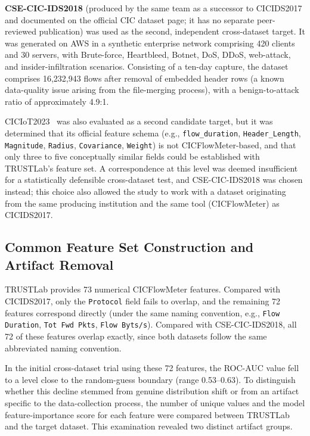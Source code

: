 \documentclass[a4paper,fleqn]{cas-sc}
\begin{document}
\textbf{CSE-CIC-IDS2018} (produced by the same team as a successor to CICIDS2017 and documented on the official CIC dataset page; it has no separate peer-reviewed publication) was used as the second, independent cross-dataset target. It was generated on AWS in a synthetic enterprise network comprising 420 clients and 30 servers, with Brute-force, Heartbleed, Botnet, DoS, DDoS, web-attack, and insider-infiltration scenarios. Consisting of a ten-day capture, the dataset comprises 16,232,943 flows after removal of embedded header rows (a known data-quality issue arising from the file-merging process), with a benign-to-attack ratio of approximately 4.9:1.

CICIoT2023~\cite{Neto2023} was also evaluated as a second candidate target, but it was determined that its official feature schema (e.g., \texttt{flow\_duration}, \texttt{Header\_Length}, \texttt{Magnitude}, \texttt{Radius}, \texttt{Covariance}, \texttt{Weight}) is not CICFlowMeter-based, and that only three to five conceptually similar fields could be established with TRUSTLab's feature set. A correspondence at this level was deemed insufficient for a statistically defensible cross-dataset test, and CSE-CIC-IDS2018 was chosen instead; this choice also allowed the study to work with a dataset originating from the same producing institution and the same tool (CICFlowMeter) as CICIDS2017.

\FloatBarrier
\subsection{Common Feature Set Construction and Artifact Removal}

TRUSTLab provides 73 numerical CICFlowMeter features. Compared with CICIDS2017, only the \texttt{Protocol} field fails to overlap, and the remaining 72 features correspond directly (under the same naming convention, e.g., \texttt{Flow Duration}, \texttt{Tot Fwd Pkts}, \texttt{Flow Byts/s}). Compared with CSE-CIC-IDS2018, all 72 of these features overlap exactly, since both datasets follow the same abbreviated naming convention.

In the initial cross-dataset trial using these 72 features, the ROC-AUC value fell to a level close to the random-guess boundary (range 0.53--0.63). To distinguish whether this decline stemmed from genuine distribution shift or from an artifact specific to the data-collection process, the number of unique values and the model feature-importance score for each feature were compared between TRUSTLab and the target dataset. This examination revealed two distinct artifact groups.
\end{document}
